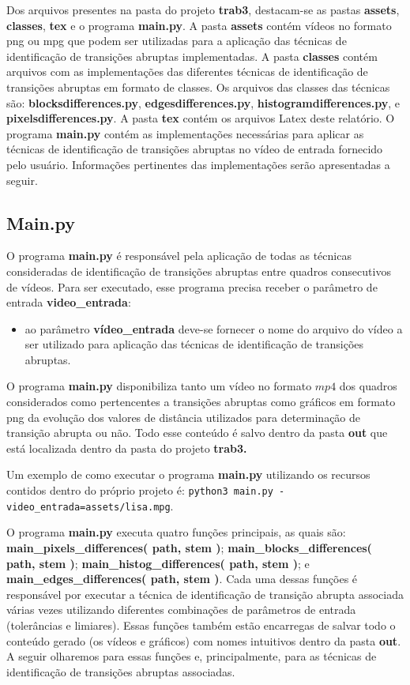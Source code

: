 \documentclass{article}
\begin{document}
Dos arquivos presentes na pasta do projeto \textbf{trab3}, destacam-se as pastas \textbf{assets}, \textbf{classes}, \textbf{tex} e o programa \textbf{main.py}. A pasta \textbf{assets} contém vídeos no formato png ou mpg que podem ser utilizadas para a aplicação das técnicas de identificação de transições abruptas implementadas. A pasta \textbf{classes} contém arquivos com as implementações das diferentes técnicas de identificação de transições abruptas em formato de classes. Os arquivos das classes das técnicas são: \textbf{blocksdifferences.py}, \textbf{edgesdifferences.py}, \textbf{histogramdifferences.py}, e \textbf{pixelsdifferences.py}. A pasta \textbf{tex} contém os arquivos Latex deste relatório. O programa \textbf{main.py} contém as implementações necessárias para aplicar as técnicas de identificação de transições abruptas no vídeo de entrada fornecido pelo usuário. Informações pertinentes das implementações serão apresentadas a seguir.


\subsection{Main.py}
O programa \textbf{main.py} é responsável pela aplicação de todas as técnicas consideradas de identificação de transições abruptas entre quadros consecutivos de vídeos. Para ser executado, esse programa precisa receber o parâmetro de entrada \textbf{video\_entrada}:

\begin{itemize}
	\item ao parâmetro \textbf{vídeo\_entrada} deve-se fornecer o nome do arquivo do vídeo a ser utilizado para aplicação das técnicas de identificação de transições abruptas.
\end{itemize}
	
\noindent 
O programa \textbf{main.py} disponibiliza tanto um vídeo no formato $mp4$ dos quadros considerados como pertencentes a transições abruptas como gráficos em formato png da evolução dos valores de distância utilizados para determinação de transição abrupta ou não. Todo esse conteúdo é salvo dentro da pasta \textbf{out} que está localizada dentro da pasta do projeto \textbf{trab3.}


Um exemplo de como executar o programa \textbf{main.py} utilizando os recursos contidos dentro do próprio projeto é: \lstinline{python3 main.py -video_entrada=assets/lisa.mpg}.

O programa \textbf{main.py} executa quatro funções principais, as quais são: \textbf{main\_pixels\_differences( path, stem )}; \textbf{main\_blocks\_differences( path, stem )}; \textbf{main\_histog\_differences( path, stem )}; e \textbf{main\_edges\_differences( path, stem )}. Cada uma dessas funções é responsável por executar a técnica de identificação de transição abrupta associada várias vezes utilizando diferentes combinações de parâmetros de entrada (tolerâncias e limiares). Essas funções também estão encarregas de salvar todo o conteúdo gerado (os vídeos e gráficos) com nomes intuitivos dentro da pasta \textbf{out}. A seguir olharemos para essas funções e, principalmente, para as técnicas de identificação de transições abruptas associadas.
\end{document}
